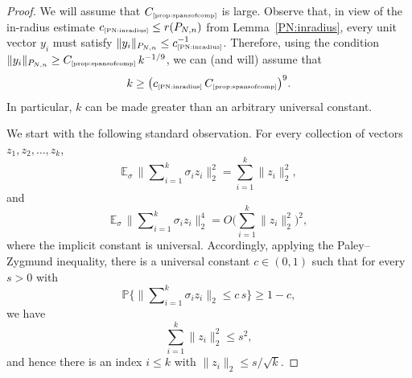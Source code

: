 \documentclass[11pt]{amsart}
\theoremstyle{definition}
\theoremstyle{plain}
\def\Prob{{\mathbb P}}
\def\Prob{{\mathbb P}}
\def\Exp{{\mathbb E}}
\begin{document}
\begin{proof}
We will assume that $C_{\text{\tiny\ref{prop:spansofcomp}}}$
is large.
Observe that, in view of the in-radius estimate
$c_{\text{\tiny\ref{PN:inradius}}}\leq r(P_{N,n})$
from Lemma~\ref{PN:inradius},
every unit vector $y_i$ must satisfy $\|y_i\|_{P_{N,n}}\leq c_{\text{\tiny\ref{PN:inradius}}}^{-1}$.
Therefore, using the condition
$\|y_i\|_{P_{N,n}}\geq
C_{\text{\tiny\ref{prop:spansofcomp}}}\,k^{-1/9}$,
we can (and will) assume that
$$
k\geq \big(c_{\text{\tiny\ref{PN:inradius}}}\,
C_{\text{\tiny\ref{prop:spansofcomp}}}\big)^9.
$$
In particular, $k$ can be made greater than an arbitrary universal constant.

We start with the 
following standard observation. For every collection
of vectors $z_1,z_2,\dots,z_k$,
$$
\Exp_\sigma\,\Big\|
\sum\nolimits_{i=1}^k \sigma_i z_i\Big\|_2^2
=\sum_{i=1}^k \big\|z_i\big\|_2^2,
$$
and
$$
\Exp_\sigma\,\Big\|
\sum\nolimits_{i=1}^k \sigma_i z_i\Big\|_2^4
=
O\bigg(\sum_{i=1}^k \big\|z_i\big\|_2^2\bigg)^2,
$$
where the implicit constant is universal.
Accordingly, applying the Paley--Zygmund inequality, 
there is a universal constant $c\in(0,1)$
such that for every $s>0$ with
$$
\Prob\bigg\{\Big\|\sum\nolimits_{i=1}^k \sigma_i z_i\Big\|_2\leq c\,s\bigg\}
\geq 1-c,
$$
we have
$$
\sum_{i=1}^k \big\|z_i\big\|_2^2\leq s^2,
$$
and hence there is an index $i\leq k$
with $\big\|z_i\big\|_2\leq s/\sqrt{k}$.

\medskip


\end{proof}
\end{document}
